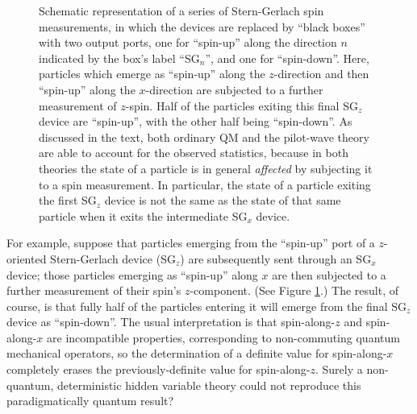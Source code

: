 \documentclass[aps,prc,onecolumn,letterpaper,floatfix,12pt]{revtex4}
\begin{document}
\begin{figure}[t]
\begin{center}
\scalebox{0.7}{

}
\caption{
Schematic representation of a series of Stern-Gerlach spin
measurements, in which the devices are replaced by ``black boxes''
with two output ports, one for ``spin-up'' along the direction $n$
indicated by the box's label ``SG$_{n}$'', and one for ``spin-down''.
Here, particles which emerge as ``spin-up'' along the $z$-direction
and then ``spin-up'' along the $x$-direction are subjected to a
further measurement of $z$-spin.  Half of the particles exiting this
final SG$_z$ device are ``spin-up'', with the other half being
``spin-down''.  As discussed in the text, both ordinary QM and 
the pilot-wave theory are able to
account for the observed statistics, because in both theories the
state of a particle is in general \emph{affected} by subjecting it to
a spin measurement.  In particular, the state of a particle
exiting the first SG$_z$ device is not the same as the state of that
same particle when it exits the intermediate SG$_x$ device.  
\label{fig4}
}
\end{center}
\end{figure}




For example, suppose that particles emerging from the ``spin-up'' port
of a $z$-oriented Stern-Gerlach device (SG$_z$) are subsequently sent through
an  SG$_x$ device; those particles emerging as
``spin-up'' along $x$ are then subjected to a further measurement of
their spin's $z$-component.  (See Figure \ref{fig4}.)  
The result, of course, is that fully half
of the particles entering it will emerge from the final SG$_z$ device
as ``spin-down''.  The usual interpretation is that spin-along-$z$ and
spin-along-$x$ are incompatible properties, corresponding to
non-commuting quantum mechanical operators, so the determination of a
definite value for spin-along-$x$ completely erases the
previously-definite value for spin-along-$z$.  Surely a non-quantum,
deterministic hidden variable theory could not reproduce this
paradigmatically quantum result?
\end{document}

